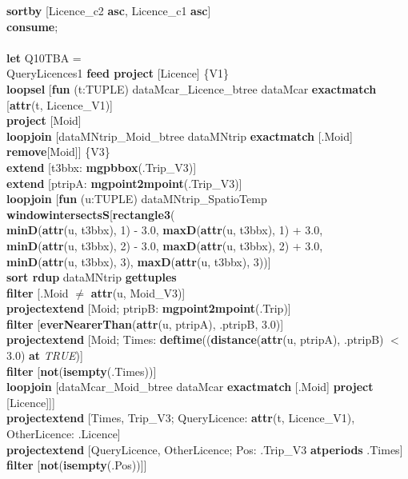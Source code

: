 \documentclass[a4paper]{article}
\newcommand{\op}[1]{\textbf{#1}}
\newcommand{\true}{\textsl{TRUE}}
\begin{document}
\begin{scriptsize}
\begin{tabbing}
\>\op{sortby} [Licence\_c2 \op{asc}, Licence\_c1 \op{asc}]\\
\op{consume};\\
\\
\op{let} Q10TBA =\\
\>QueryLicences1 \op{feed project} [Licence] \{V1\}\\
\>\op{loopsel} [\op{fun} (t:TUPLE) dataMcar\_Licence\_btree dataMcar \op{exactmatch} [\op{attr}(t, Licence\_V1)]\\
\>\>\op{project} [Moid]\\
\>\>\op{loopjoin} [dataMNtrip\_Moid\_btree dataMNtrip \op{exactmatch} [.Moid] \op{remove}[Moid]] \{V3\}\\
\>\>\op{extend} [t3bbx: \op{mgpbbox}(.Trip\_V3)]\\
\>\>\op{extend} [ptripA: \op{mgpoint2mpoint}(.Trip\_V3)]\\
\>\>\op{loopjoin} [\op{fun} (u:TUPLE) dataMNtrip\_SpatioTemp \op{windowintersectsS}[\op{rectangle3}(\\
\>\>\>\>\op{minD}(\op{attr}(u, t3bbx), 1) - 3.0, \op{maxD}(\op{attr}(u, t3bbx), 1) + 3.0,\\
\>\>\>\>\op{minD}(\op{attr}(u, t3bbx), 2) - 3.0, \op{maxD}(\op{attr}(u, t3bbx), 2) + 3.0,\\
\>\>\>\>\op{minD}(\op{attr}(u, t3bbx), 3), \op{maxD}(\op{attr}(u, t3bbx), 3))]\\
\>\>\>\op{sort rdup} dataMNtrip \op{gettuples}\\
\>\>\>\op{filter} [.Moid $\neq$ \op{attr}(u, Moid\_V3)]\\
\>\>\>\op{projectextend} [Moid; ptripB: \op{mgpoint2mpoint}(.Trip)]\\
\>\>\>\op{filter} [\op{everNearerThan}(\op{attr}(u, ptripA), .ptripB, 3.0)]\\
\>\>\>\op{projectextend} [Moid; Times: \op{deftime}((\op{distance}(\op{attr}(u, ptripA), .ptripB) $<$ 3.0) \op{at} \true{})]\\
\>\>\>\op{filter} [\op{not}(\op{isempty}(.Times))]\\
\>\>\>\op{loopjoin} [dataMcar\_Moid\_btree dataMcar \op{exactmatch} [.Moid] \op{project} [Licence]]]\\
\>\>\op{projectextend} [Times, Trip\_V3; QueryLicence: \op{attr}(t, Licence\_V1), OtherLicence: .Licence]\\
\>\>\op{projectextend} [QueryLicence, OtherLicence; Pos: .Trip\_V3 \op{atperiods} .Times]\\
\>\>\op{filter} [\op{not}(\op{isempty}(.Pos))]]\\

\end{tabbing}
\end{scriptsize}
\end{document}
